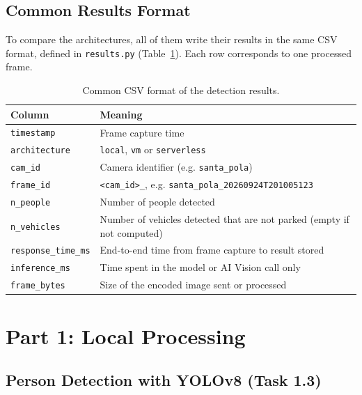\documentclass{article}
\begin{document}
    \subsection{Common Results Format}
    \label{sec:results-format}

    To compare the architectures, all of them write their results in the same CSV format, defined in \texttt{results.py} (Table~\ref{tab:csv-format}). Each row corresponds to one processed frame.

    \begin{table}[htbp]
        \centering
        \small
        \begin{tabular}{lp{9cm}}
            \toprule
            \textbf{Column} & \textbf{Meaning} \\
            \midrule
            \texttt{timestamp}        & Frame capture time \\
            \texttt{architecture}     & \texttt{local}, \texttt{vm} or \texttt{serverless} \\
            \texttt{cam\_id}          & Camera identifier (e.g. \texttt{santa\_pola}) \\
            \texttt{frame\_id}        & \texttt{<cam\_id>\_<capture time>}, e.g. \texttt{santa\_pola\_20260924T201005123} \\
            \texttt{n\_people}        & Number of people detected \\
            \texttt{n\_vehicles}      & Number of vehicles detected that are not parked (empty if not computed) \\
            \texttt{response\_time\_ms} & End-to-end time from frame capture to result stored \\
            \texttt{inference\_ms}    & Time spent in the model or AI Vision call only \\
            \texttt{frame\_bytes}     & Size of the encoded image sent or processed \\
            \bottomrule
        \end{tabular}
        \caption{Common CSV format of the detection results.}
        \label{tab:csv-format}
    \end{table}


\section{Part 1: Local Processing}
    \subsection{Person Detection with YOLOv8 (Task 1.3)}
\end{document}
